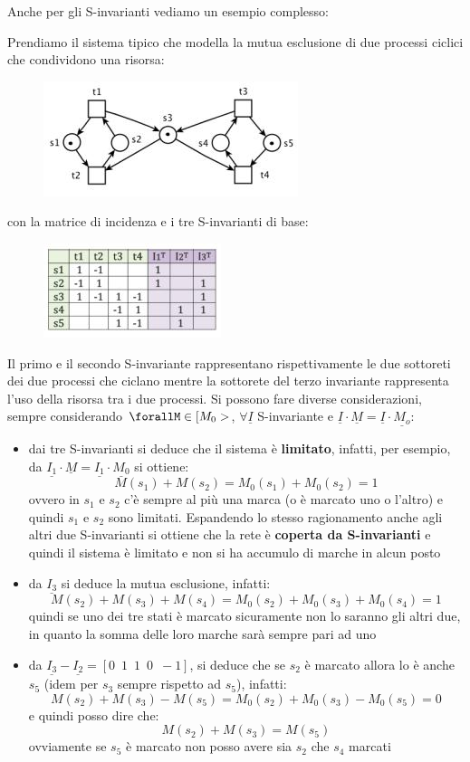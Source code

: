 \documentclass[a4paper,12pt, oneside]{book}
\begin{document}
Anche per gli S-invarianti vediamo un esempio complesso:
\begin{esempio}
  Prendiamo il sistema tipico che modella la mutua esclusione di due processi
  ciclici che condividono una risorsa: 
  \begin{figure}[H]
    \centering
    \includegraphics[scale = 0.8]{img/si9.jpg}
  \end{figure}
  \newpage
  con la matrice di incidenza e i tre S-invarianti di base:
   \begin{figure}[H]
    \centering
    \includegraphics[scale = 0.8]{img/si10.jpg}
  \end{figure}
  Il primo e il secondo S-invariante rappresentano rispettivamente le due
  sottoreti dei due processi che ciclano mentre la sottorete del terzo
  invariante rappresenta l'uso della risorsa tra i due processi. Si possono fare
  diverse considerazioni, sempre considerando $\forallM\in[M_0>$,
  $\forall\underline{I}$ S-invariante e
  $\underline{I}\cdot\underline{M}=\underline{I}\cdot \underline{M_o}$:
  \begin{itemize}
    \item dai tre S-invarianti si deduce che il sistema è \textbf{limitato},
    infatti, per esempio, da
    $\underline{I_1}\cdot\underline{M}=\underline{I_1}\cdot\underline{M_0}$ si
    ottiene:
    \[M(s_1)+M(s_2)=M_0(s_1)+M_0(s_2)=1\]
    ovvero in $s_1$ e $s_2$ c'è sempre al più una marca (o è marcato uno o
    l'altro) e quindi $s_1$ e $s_2$ sono limitati. Espandendo lo stesso
    ragionamento anche agli altri due S-invarianti si ottiene che la
      rete è \textbf{coperta da S-invarianti} e quindi il sistema è limitato e
      non si ha accumulo di marche in alcun posto
    \item da $\underline{I_3}$ si deduce la mutua esclusione, infatti:
    \[M(s_2)+M(s_3)+M(s_4)=M_0(s_2)+M_0(s_3)+M_0(s_4)=1\]
    quindi se uno dei tre stati è marcato sicuramente non lo saranno gli altri
    due, in quanto la somma delle loro marche sarà sempre pari ad uno
    \item da $\underline{I_3}-\underline{I_2}=[0\,\,\,1\,\,\,1\,\,\,0\,\,\,-1]$,
    si deduce che se $s_2$ è marcato allora lo è anche $s_5$ (idem per $s_3$
    sempre rispetto ad $s_5$), infatti:
    \[M(s_2)+M(s_3)-M(s_5)=M_0(s_2)+M_0(s_3)-M_0(s_5)=0\]
    e quindi posso dire che:
    \[M(s_2)+M(s_3)=M(s_5)\]
    ovviamente se $s_5$ è marcato non posso avere sia $s_2$ che $s_4$ marcati
  \end{itemize}
\end{esempio}
\end{document}
